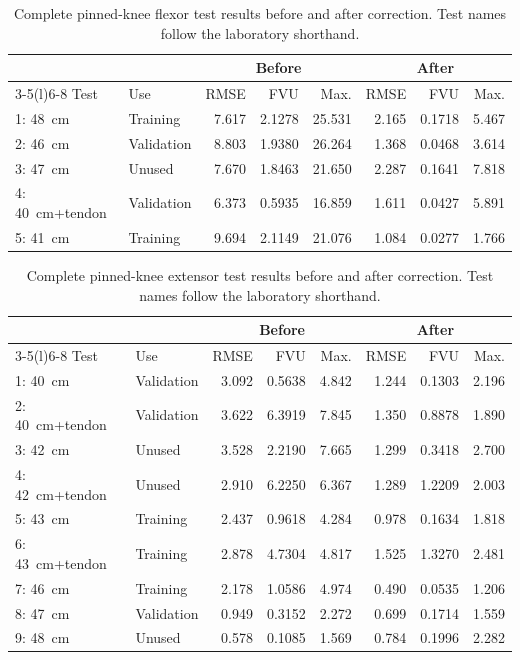 \begin{table}[htbp]
\centering\small\setlength{\tabcolsep}{3pt}
\caption{Complete pinned-knee flexor test results before and after correction. Test names follow the laboratory shorthand.}
\label{tab:app_gof}
\begin{tabular}{@{}llrrrrrr@{}}
\toprule
 & & \multicolumn{3}{c}{Before} & \multicolumn{3}{c}{After} \\
\cmidrule(lr){3-5}\cmidrule(l){6-8}
Test & Use & RMSE & FVU & Max. & RMSE & FVU & Max. \\
\midrule
1: \qty{48}{\cm} & Training & 7.617 & 2.1278 & 25.531 & 2.165 & 0.1718 & 5.467 \\
2: \qty{46}{\cm} & Validation & 8.803 & 1.9380 & 26.264 & 1.368 & 0.0468 & 3.614 \\
3: \qty{47}{\cm} & Unused & 7.670 & 1.8463 & 21.650 & 2.287 & 0.1641 & 7.818 \\
4: \qty{40}{\cm}+tendon & Validation & 6.373 & 0.5935 & 16.859 & 1.611 & 0.0427 & 5.891 \\
5: \qty{41}{\cm} & Training & 9.694 & 2.1149 & 21.076 & 1.084 & 0.0277 & 1.766 \\
\bottomrule
\end{tabular}
\end{table}

\begin{table}[htbp]
\centering\small\setlength{\tabcolsep}{3pt}
\caption{Complete pinned-knee extensor test results before and after correction. Test names follow the laboratory shorthand.}
\label{tab:app_gof_ext_all}
\begin{tabular}{@{}llrrrrrr@{}}
\toprule
 & & \multicolumn{3}{c}{Before} & \multicolumn{3}{c}{After} \\
\cmidrule(lr){3-5}\cmidrule(l){6-8}
Test & Use & RMSE & FVU & Max. & RMSE & FVU & Max. \\
\midrule
1: \qty{40}{\cm} & Validation & 3.092 & 0.5638 & 4.842 & 1.244 & 0.1303 & 2.196 \\
2: \qty{40}{\cm}+tendon & Validation & 3.622 & 6.3919 & 7.845 & 1.350 & 0.8878 & 1.890 \\
3: \qty{42}{\cm} & Unused & 3.528 & 2.2190 & 7.665 & 1.299 & 0.3418 & 2.700 \\
4: \qty{42}{\cm}+tendon & Unused & 2.910 & 6.2250 & 6.367 & 1.289 & 1.2209 & 2.003 \\
5: \qty{43}{\cm} & Training & 2.437 & 0.9618 & 4.284 & 0.978 & 0.1634 & 1.818 \\
6: \qty{43}{\cm}+tendon & Training & 2.878 & 4.7304 & 4.817 & 1.525 & 1.3270 & 2.481 \\
7: \qty{46}{\cm} & Training & 2.178 & 1.0586 & 4.974 & 0.490 & 0.0535 & 1.206 \\
8: \qty{47}{\cm} & Validation & 0.949 & 0.3152 & 2.272 & 0.699 & 0.1714 & 1.559 \\
9: \qty{48}{\cm} & Unused & 0.578 & 0.1085 & 1.569 & 0.784 & 0.1996 & 2.282 \\
\bottomrule
\end{tabular}
\end{table}

